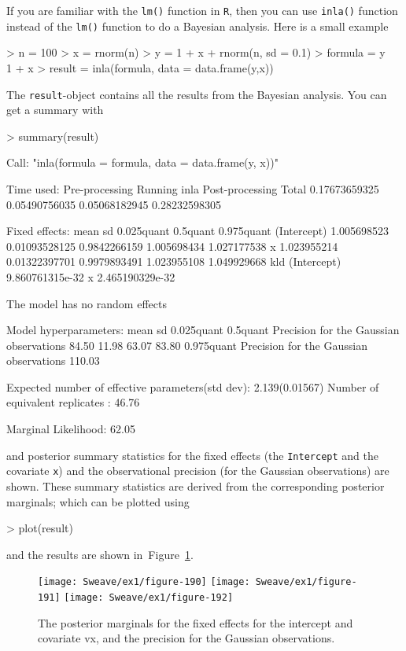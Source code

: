 \documentclass[a4paper,11pt]{report}
\newcommand{\tv}{\texttt}
\def\Fig#1{Figure~\ref{#1}}
\begin{document}
If you are familiar with the \verb|lm()| function in \tv{R}, then you
can use \verb|inla()| function instead of the \verb|lm()| function to
do a Bayesian analysis. Here is a small example
\begin{Schunk}
\begin{Sinput}
> n = 100
> x = rnorm(n)
> y = 1 + x + rnorm(n, sd = 0.1)
> formula = y ~ 1 + x
> result = inla(formula, data = data.frame(y,x))
\end{Sinput}
\end{Schunk}
The \verb|result|-object contains all the results from the Bayesian analysis.
You can get a summary with
\begin{Schunk}
\begin{Sinput}
> summary(result)
\end{Sinput}
\begin{Soutput}
Call:
"inla(formula = formula, data = data.frame(y, x))"

Time used:
 Pre-processing    Running inla Post-processing           Total 
  0.17673659325   0.05490756035   0.05068182945   0.28232598305 

Fixed effects:
                   mean            sd   0.025quant    0.5quant  0.975quant
(Intercept) 1.005698523 0.01093528125 0.9842266159 1.005698434 1.027177538
x           1.023955214 0.01322397701 0.9979893491 1.023955108 1.049929668
                        kld
(Intercept) 9.860761315e-32
x           2.465190329e-32

The model has no random effects

Model hyperparameters:
                                        mean   sd     0.025quant 0.5quant
Precision for the Gaussian observations  84.50  11.98  63.07      83.80  
                                        0.975quant
Precision for the Gaussian observations 110.03    

Expected number of effective parameters(std dev): 2.139(0.01567)
Number of equivalent replicates : 46.76 

Marginal Likelihood:  62.05 
\end{Soutput}
\end{Schunk}
and posterior summary statistics for the fixed effects (the
\tv{Intercept} and the covariate \tv{x}) and the observational
precision (for the Gaussian observations) are shown. These summary
statistics are derived from the corresponding posterior marginals;
which can be plotted using
\begin{Schunk}
\begin{Sinput}
> plot(result)
\end{Sinput}
\end{Schunk}
and the results are shown in~\Fig{fig:11}.
\begin{figure}[tbp]\centering\texttt{[image: Sweave/ex1/figure-190]}
\texttt{[image: Sweave/ex1/figure-191]}
\texttt{[image: Sweave/ex1/figure-192]}\caption{The posterior marginals for the fixed effects for the intercept and covariate 	v{x}, and the precision for the Gaussian observations.}\label{fig:11}\end{figure}%
\end{document}
